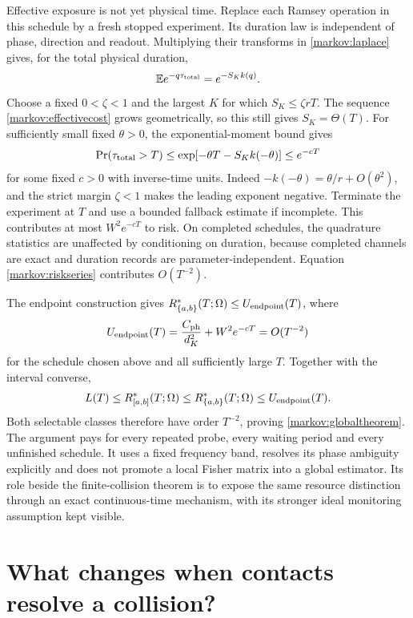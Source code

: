 \documentclass[11pt,a4paper]{article}
\numberwithin{equation}{section}
\theoremstyle{remark}
\begin{document}
Effective exposure is not yet physical time. Replace each Ramsey operation
in this schedule by a fresh stopped experiment. Its duration law is
independent of phase, direction and readout. Multiplying their transforms
in \eqref{markov:laplace} gives, for the total physical duration,
\begin{equation}
 \mathbb E e^{-q\tau_{\rm total}}=e^{-S_Kk(q)}.
\end{equation}
Choose a fixed $0<\zeta<1$ and the largest $K$ for which
$S_K\le\zeta rT$. The sequence \eqref{markov:effectivecost} grows
geometrically, so this still gives $S_K=\Theta(T)$. For sufficiently small
fixed $\theta>0$, the exponential-moment bound gives
\begin{equation}
 \Pr(\tau_{\rm total}>T)
 \le\exp[-\theta T-S_Kk(-\theta)]\le e^{-cT}
 \label{markov:deadline}
\end{equation}
for some fixed $c>0$ with inverse-time units. Indeed
$-k(-\theta)=\theta/r+O(\theta^2)$, and the strict margin $\zeta<1$
makes the leading exponent negative. Terminate the experiment at $T$ and
use a bounded fallback estimate if incomplete. This contributes at most
$W^2e^{-cT}$ to risk. On completed schedules, the quadrature statistics are
unaffected by conditioning on duration, because completed channels are exact
and duration records are parameter-independent. Equation
\eqref{markov:riskseries} contributes $O(T^{-2})$.

The endpoint construction gives $R_{\{a,b\}}^*(T;\Omega)\le
U_{\rm endpoint}(T)$, where
\begin{equation}
 U_{\rm endpoint}(T)=\frac{C_{\rm ph}}{d_K^2}+W^2e^{-cT}=O(T^{-2})
\end{equation}
for the schedule chosen above and all sufficiently large $T$.
Together with the interval converse,
\begin{equation}
 L(T)\le R_{[a,b]}^*(T;\Omega)\le R_{\{a,b\}}^*(T;\Omega)
 \le U_{\rm endpoint}(T).
\end{equation}
Both selectable classes therefore have order $T^{-2}$, proving
\eqref{markov:globaltheorem}. The argument pays for every repeated probe,
every waiting period and every unfinished schedule. It uses a fixed frequency
band, resolves its phase ambiguity explicitly and does not promote a local
Fisher matrix into a global estimator. Its role beside the finite-collision
theorem is to expose the same resource distinction through an exact
continuous-time mechanism, with its stronger ideal monitoring assumption
kept visible.


\section{What changes when contacts resolve a collision?}
\label{time:access}
\end{document}

